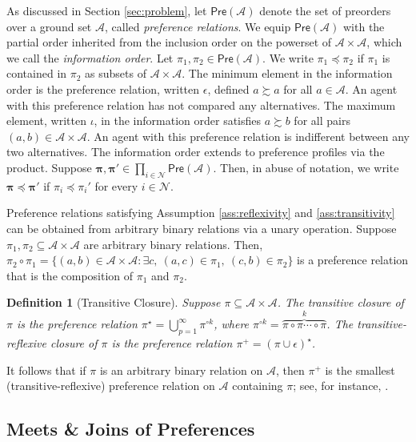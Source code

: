 \documentclass[conference]{ieeeconf}
\renewcommand{\preceq}{\preccurlyeq}
\newcommand{\N}{\mathcal{N}}
\newcommand{\A}{\mathcal{A}}
\newcommand{\Pref}{\mathsf{Pre}}
\newcommand{\prefers}{\succsim}
\newcommand{\profile}{\boldsymbol{\pi}}
\newtheorem{definition}{Definition}
\begin{document}
As discussed in Section \ref{sec:problem}, let $\Pref(\A)$ denote the set of preorders over a ground set $\A$, called \emph{preference relations}. We equip $\Pref(\A)$ with the partial order inherited from the inclusion order on the powerset of $\A \times \A$, which we call the \emph{information order}. Let $\pi_1, \pi_2 \in \Pref(\A)$. We write $\pi_1 \preceq \pi_2$ if $\pi_1$ is contained in $\pi_2$ as subsets of $\A \times \A$. The minimum element in the information order is the preference relation, written $\epsilon$, defined $a \prefers a$ for all $a \in \A$. An agent with this preference relation has not compared any alternatives. The maximum element, written $\iota$, in the information order satisfies $a \prefers b$ for all pairs $(a,b) \in \A \times \A$. An agent with this preference relation is indifferent between any two alternatives. The information order extends to preference profiles via the product. Suppose $\profile, \profile' \in \prod_{i \in \N}  \Pref(\A)$. Then, in abuse of notation, we write $\profile \preceq \profile'$ if $\pi_i \preceq \pi_i'$ for every $i \in \N$.

Preference relations satisfying Assumption \ref{ass:reflexivity} and \ref{ass:transitivity} can be obtained from arbitrary binary relations via a unary operation. Suppose $\pi_1, \pi_2 \subseteq \A \times \A$ are arbitrary binary relations. Then, $\pi_2 \circ \pi_1 = \{ (a,b) \in \A \times \A : \exists c,~(a,c) \in \pi_1,~(c,b) \in \pi_2 \}$ is a preference relation that is the composition of $\pi_1$ and $\pi_2$.

\begin{definition}[Transitive Closure] \label{def:transitive-closure}
    Suppose $\pi \subseteq \A \times \A$. The \emph{transitive closure} of $\pi$ is the preference relation $\pi^{\star} = \bigcup_{p=1}^{\infty} \pi^{\circ k}$, where $\pi^{\circ k} = \overbrace{\pi \circ \pi \cdots \circ \pi}^{k}$. The \emph{transitive-reflexive closure} of $\pi$ is the preference relation $\pi^{+} = \left( \pi \cup \epsilon \right)^\star$.
\end{definition}

It follows that if $\pi$ is an arbitrary binary relation on $\A$, then $\pi^{+}$ is the smallest (transitive-reflexive) preference relation on $\A$ containing $\pi$; see, for instance, \cite[Theorem 1.1\textbf{}7]{roman2008}.

\subsection{Meets \& Joins of Preferences}
\end{document}

